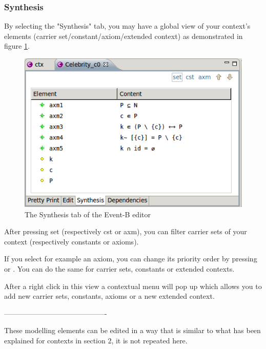 \subsubsection{Synthesis}

By selecting the "Synthesis" tab, you may have a global view of your context's elements (carrier set/constant/axiom/extended context) as demonstrated in figure \ref{fig_ref_01_eventb_editor11}. 

\begin{figure}[!h]
\begin{center}
	\includegraphics{img/reference/ref_01_eventb_editor11.png}
	\caption{The Synthesis tab of the Event-B editor}
	\label{fig_ref_01_eventb_editor11}
\end{center}
\end{figure}

After pressing set (respectively cst or axm), you can filter carrier sets of your context (respectively constants or axioms).

If you select for example an axiom, you can change its priority order by pressing  or ‎. You can do the same for carrier sets, constants or extended contexts.

After a right click in this view a contextual menu will pop up which allows you to add new carrier sets, constants, axioms or a new extended context. 

-------------------------------------------

These modelling elements can be edited in a way that is similar to what has been explained for contexts in section 2, it is not repeated here.

